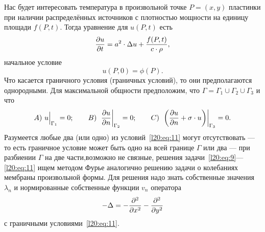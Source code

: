 \noindent Нас будет интересовать температура в произвольной точке $P=(x,y)$ пластинки при наличии распределённых источников с плотностью мощности на единицу площади $f(P,t)$. Тогда уравнение для $u(P,t)$ есть 
\begin{equation}\label{l20:eq:9}
	\frac{\partial u}{\partial t}=a^2\cdot\Delta u+\frac{f(P,t)}{c\cdot\rho},
\end{equation}
начальное условие
\begin{equation}\label{l20:eq:10}
	u(P,0)=\phi(P).
\end{equation}
Что касается граничного условия (граничных условий), то они предполагаются однородными. Для максимальной общности предположим, что $\Gamma=\Gamma_{1}\cup\Gamma_{2}\cup\Gamma_{3}$ и что
\begin{equation}\label{l20:eq:11}
	A)\ u\Big|_{\Gamma_{1}}=0;\qquad B)\ \left.\pder{u}{n}\right|_{\Gamma_{2}}=0;\qquad C)\ \left.\left(\pder{u}{n}+\sigma\cdot u\right)\right|_{\Gamma_{3}}=0.
\end{equation}
Разумеется любые два (или одно) из условий~\eqref{l20:eq:11} могут отсутствовать --- то есть граничное условие может быть одно на всей границе $\Gamma$ или два --- при разбиении $\Gamma$ на две части,возможно не связные, решения задачи~\eqref{l20:eq:9}---\eqref{l20:eq:11} ищем методом Фурье аналогично решению задачи о колебаниях мембраны произвольной формы. Для решения надо знать собственные значения $\lambda_n$ и нормированные собственные функции $v_n$ оператора 
\begin{equation*}
	-\Delta=-\frac{\partial^2}{\partial x^2}-\frac{\partial^2}{\partial y^2} 
\end{equation*}
с граничными условиями~\eqref{l20:eq:11}. 

